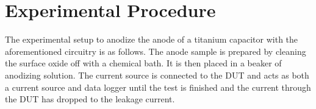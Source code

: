 \section{Experimental Procedure}
The experimental setup to anodize the anode of a titanium capacitor with the aforementioned circuitry is as follows. The anode sample is prepared by cleaning the surface oxide off with a chemical bath. It is then placed in a beaker of anodizing solution. The current source is connected to the DUT and acts as both a current source and data logger until the test is finished and the current through the DUT has dropped to the leakage current.
